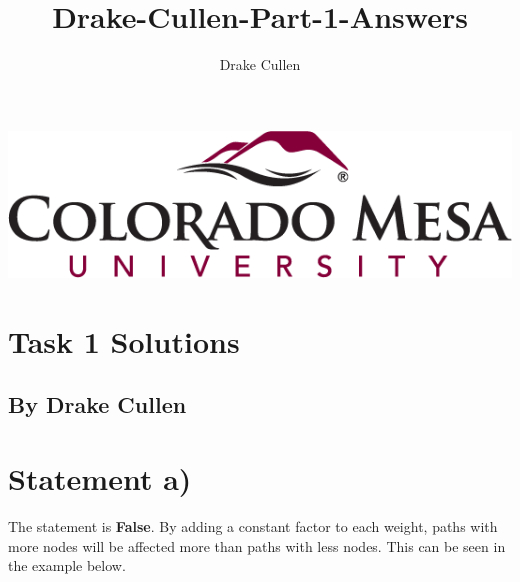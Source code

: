 \documentclass[11pt]{article}
\title{Drake-Cullen-Part-1-Answers}
\author{Drake Cullen}
\begin{document}
\begin{minipage}{\linewidth}%
\centering
\includegraphics[keepaspectratio=true,scale=0.35]{CMU.png}
\end{minipage}
\section*{ \centering Task 1 Solutions}
\subsection*{ \centering By Drake Cullen} 

\vspace{5mm}
 

\section{Statement a)}
The statement is \textbf{False}. By adding a constant factor to each weight, paths with more nodes will be affected more than paths with less nodes. This can be seen in the example below. 
\end{document}
